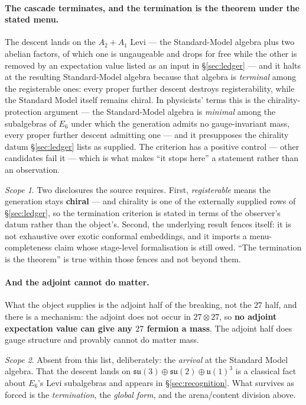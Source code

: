 \documentclass[11pt,a4paper]{article}
\theoremstyle{definition}
\theoremstyle{remark}
\newtheorem{scopenote}{Scope}
\begin{document}
\paragraph{The cascade terminates, and the termination is the theorem under the stated menu.} The descent lands on the $A_2{+}A_1$ Levi ---
the Standard-Model algebra plus two abelian factors, of which one is ungaugeable and drops for free while the other is
removed by an expectation value listed as an input in \S\ref{sec:ledger} --- and it halts at the resulting
Standard-Model algebra because that algebra is \emph{terminal} among the registerable ones: every
proper further descent destroys registerability, while the Standard Model itself remains chiral. In physicists' terms
this is the chirality-protection argument --- the Standard-Model algebra is \emph{minimal} among the subalgebras of $E_6$ under
which the generation admits no gauge-invariant mass, every proper further descent admitting one --- and it presupposes the chirality datum \S\ref{sec:ledger} lists as
supplied. The
criterion has a positive control --- other candidates fail it --- which is what makes ``it stops
here'' a statement rather than an observation.

\begin{scopenote}
Two disclosures the source requires. First, \emph{registerable} means the generation stays
\textbf{chiral} --- and chirality is one of the externally supplied rows of \S\ref{sec:ledger}, so
the termination criterion is stated in terms of the observer's datum rather than the object's.
Second, the underlying result fences itself: it is not exhaustive over exotic conformal embeddings,
and it imports a menu-completeness claim whose stage-level formalisation is still owed. ``The
termination is the theorem'' is true within those fences and not beyond them.
\end{scopenote}

\paragraph{And the adjoint cannot do matter.} What the object supplies is the adjoint half of the
breaking, not the $27$ half, and there is a mechanism: the adjoint does not occur in
$27\otimes 27$, so \textbf{no adjoint expectation value can give any $27$ fermion a mass}. The
adjoint half does gauge structure and provably cannot do matter mass.

\begin{scopenote}
Absent from this list, deliberately: the \emph{arrival} at the Standard Model algebra. That the
descent lands on $\mathfrak{su}(3)\oplus\mathfrak{su}(2)\oplus\mathfrak{u}(1)^3$ is a classical fact
about $E_6$'s Levi subalgebras and appears in \S\ref{sec:recognition}. What survives as forced is the
\emph{termination}, the \emph{global form}, and the arena/content division above.
\end{scopenote}
\end{document}
